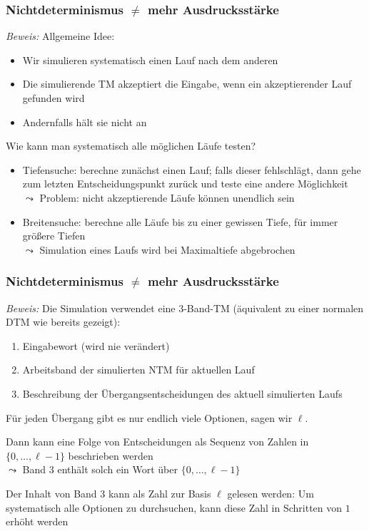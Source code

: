 \documentclass[onlymath]{beamer}
\begin{document}
\begin{frame}[t]\frametitle{Nichtdeterminismus $\neq$ mehr Ausdrucksstärke}

\pause

\emph{Beweis:} Allgemeine Idee:
\begin{itemize}
\item Wir simulieren systematisch einen Lauf nach dem anderen
\item Die simulierende TM akzeptiert die Eingabe, wenn ein akzeptierender Lauf gefunden wird
\item Andernfalls hält sie nicht an
\end{itemize}\pause

\alert{Wie kann man systematisch alle möglichen Läufe testen?}
\begin{itemize}
\item Tiefensuche: berechne zunächst einen Lauf; falls dieser fehlschlägt, dann gehe zum letzten Entscheidungspunkt zurück und teste eine andere Möglichkeit\\\pause
$\leadsto$ Problem: nicht akzeptierende Läufe können unendlich sein\pause
%
\item Breitensuche: berechne alle Läufe bis zu einer gewissen Tiefe, für immer größere Tiefen\\
$\leadsto$ Simulation eines Laufs wird bei Maximaltiefe abgebrochen
\end{itemize}

\end{frame}

\begin{frame}[t]\frametitle{Nichtdeterminismus $\neq$ mehr Ausdrucksstärke}

\pause

\emph{Beweis:} Die Simulation verwendet eine 3-Band-TM (äquivalent zu einer normalen DTM wie bereits gezeigt):
\begin{enumerate}[{Band} 1:]
\item Eingabewort (wird nie verändert)
\item Arbeitsband der simulierten NTM für aktuellen Lauf
\item Beschreibung der Übergangsentscheidungen des aktuell simulierten Laufs
\end{enumerate}\pause
Für jeden Übergang gibt es nur endlich viele Optionen, sagen wir $\ell$.\medskip%

Dann kann eine Folge von Entscheidungen als Sequenz von Zahlen in $\{0,\ldots, \ell-1\}$ beschrieben werden\\
$\leadsto$ Band 3 enthält solch ein Wort über $\{0,\ldots, \ell-1\}$\medskip%

Der Inhalt von Band 3 kann als Zahl zur Basis $\ell$ gelesen werden: Um systematisch alle Optionen
zu durchsuchen, kann diese Zahl in Schritten von $1$ erhöht werden

\end{frame}
\end{document}

